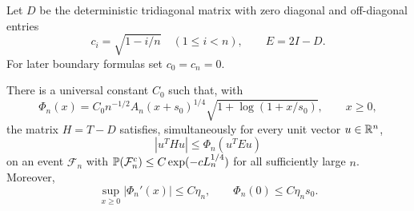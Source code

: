Let $D$ be the deterministic tridiagonal matrix with zero diagonal and
off-diagonal entries
\[
 c_i=\sqrt{1-i/n}\quad(1\le i<n),\qquad E=2I-D.
\]
For later boundary formulas set $c_0=c_n=0$.

\begin{lemma}
\label{lem:form-bound}
There is a universal constant $C_0$ such that, with
\[
 \Phi_n(x)=C_0n^{-1/2}A_n(x+s_0)^{1/4}
             \sqrt{1+\log(1+x/s_0)},\qquad x\ge0,
\]
the matrix $H=T-D$ satisfies, simultaneously for every unit vector
$u\in\mathbb R^n$,
\begin{equation}
 |u^THu|\le\Phi_n(u^TEu)
 \label{eq:form-bound}
\end{equation}
on an event $\mathcal F_n$ with
$\mathbb P(\mathcal F_n^c)\le C\exp(-cL_n^{1/4})$ for all sufficiently large $n$.
Moreover,
\begin{equation}
 \sup_{x\ge0}|\Phi_n'(x)|\le C\eta_n,
 \qquad \Phi_n(0)\le C\eta_ns_0.
 \label{eq:phi-smallness}
\end{equation}
\end{lemma}

